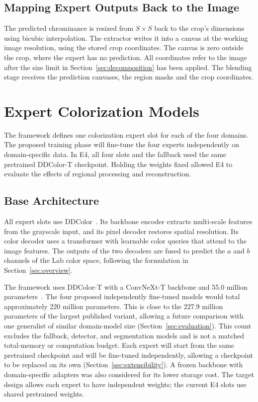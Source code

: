 \documentclass{FastFyp}
\begin{document}
\subsection{Mapping Expert Outputs Back to the Image}
\label{sec:placement}

The predicted chrominance is resized from $S\times S$ back to the crop's
dimensions using bicubic interpolation. The extractor writes it into a canvas
at the working image resolution, using the stored crop coordinates. The
canvas is zero outside the crop, where the expert has no prediction. All
coordinates refer to the image after the size limit in
Section~\ref{sec:decomposition} has been applied. The blending stage receives
the prediction canvases, the region masks and the crop coordinates.

\section{Expert Colorization Models}
\label{sec:experts}

The framework defines one colorization expert slot for each of the four
domains. The proposed training phase will fine-tune the four experts
independently on domain-specific data. In E4, all four slots and the fallback
used the same pretrained DDColor-T checkpoint. Holding the weights fixed
allowed E4 to evaluate the effects of regional processing and reconstruction.

\subsection{Base Architecture}

All expert slots use DDColor~\cite{ref9}. Its backbone encoder extracts
multi-scale features from the grayscale input, and its pixel decoder
restores spatial resolution. Its color decoder uses a transformer with
learnable color queries that attend to the image features. The outputs of
the two decoders are fused to predict the $a$ and $b$ channels of the Lab
color space, following the formulation in Section~\ref{sec:overview}.

The framework uses DDColor-T with a ConvNeXt-T backbone and 55.0 million
parameters~\cite{ref9,ref10}. The four proposed independently fine-tuned
models would total approximately 220 million parameters. This is close to
the 227.9 million parameters of the largest published variant, allowing
a future comparison with one generalist of similar domain-model size (Section~\ref{sec:evaluation}). This count excludes the fallback, detector, and segmentation models and is not a matched total-memory or computation budget. Each expert will start from the same
pretrained checkpoint and will be fine-tuned independently, allowing a
checkpoint to be replaced on its own (Section~\ref{sec:extensibility}).
A frozen backbone with domain-specific adapters was also considered for its
lower storage cost. The target design allows each expert to have independent weights; the current E4 slots use shared pretrained weights.
\end{document}
